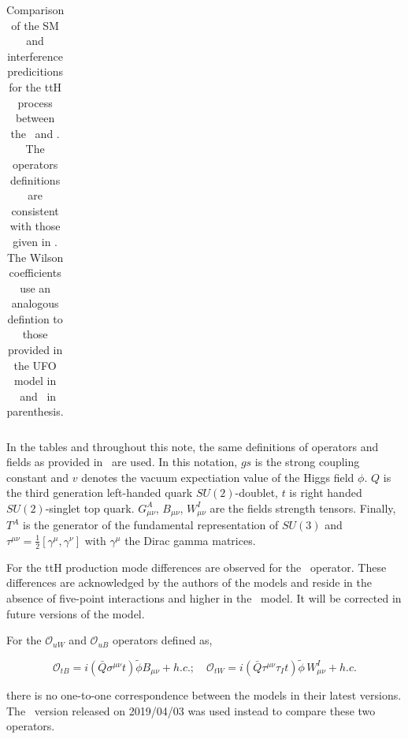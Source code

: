 \begin{table}[h!]
{\begin{tabular}{|l|l|c|c|}
      \hline
    \end{tabular}
  }
  \caption{ Comparison of the SM and interference predicitions for the ttH process between the \SMEFTsim\ and \SMEFTatNLO. The operators definitions are consistent with those given in \SMEFTatNLO. The Wilson coefficients use an analogous defintion to those provided  in the UFO model in \SMEFTatNLO\ and \SMEFTsim\ in parenthesis.}
  \label{tab:higgseft:tthcompa}
\end{table}


In the tables and throughout this note, the same definitions of operators and fields as provided in~\cite{SMEFTNLOdefs} are used. In this notation, $gs$ is the strong coupling constant and $v$ denotes the vacuum expectiation value of the Higgs field $\phi$. $Q$ is the third generation left-handed quark $SU(2)$-doublet, $t$ is right handed $SU(2)$-singlet top quark. $G_{\mu\nu}^{A}$, $B_{\mu\nu}$, $W^{I}_{\mu\nu}$ are the fields strength tensors. Finally, $T^{A}$ is the generator of the fundamental representation of $SU(3)$ and $\tau^{\mu\nu}=\frac{1}{2}[\gamma^{\mu},\gamma^{\nu}]$  with $\gamma^{\mu}$ the Dirac gamma matrices.



For the ttH production mode differences are observed for the \ctG\ operator. These differences are acknowledged by the authors of the models and reside in the absence of five-point interactions and higher in the \SMEFTsim\ model. It will be corrected in future versions of the model.

For the $\mathcal{O}_{uW}$ and $\mathcal{O}_{uB}$ operators defined as,

$$ \mathcal{O}_{tB} = i(\bar Q \sigma^{\mu\nu} t) \tilde \phi  B_{\mu\nu} + h.c.; \quad
   \mathcal{O}_{tW} =  i(\bar{Q} \tau^{\mu\nu}\tau_{I} t)  \tilde{\phi} \, W_{\mu\nu}^I + h. c.
$$

   there is no one-to-one correspondence between the models in their latest versions. The \SMEFTatNLO\ version released on 2019/04/03 was used instead to compare these two operators.

